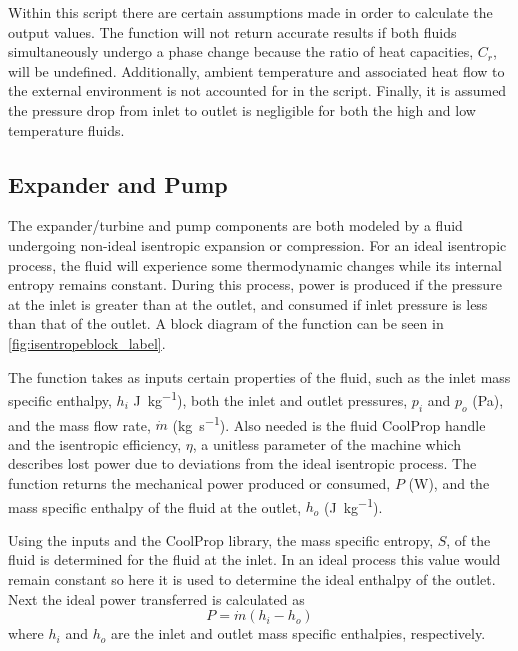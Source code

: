 Within this script there are certain assumptions made in order to calculate the output values. The function will not return accurate results if both fluids simultaneously undergo a phase change because the ratio of heat capacities, $C_r$, will be undefined. Additionally, ambient temperature and associated heat flow to the external environment is not accounted for in the script. Finally, it is assumed the pressure drop from inlet to outlet is negligible for both the high and low temperature fluids. 


\subsection{Expander and Pump}
\label{sec:isentrope}
The expander/turbine and pump components are both modeled by a fluid undergoing non-ideal isentropic expansion or compression. For an ideal isentropic process, the fluid will experience some thermodynamic changes while its internal entropy remains constant. During this process, power is produced if the pressure at the inlet is greater than at the outlet, and consumed if inlet pressure is less than that of the outlet. A block diagram of the function can be seen in \autoref{fig:isentropeblock_label}.


The function takes as inputs certain properties of the fluid, such as the inlet mass specific enthalpy, $h_i$ \si{\joule\per\kilogram}), both the inlet and outlet pressures, $p_i$ and $p_o$ (\si{\pascal}), and the mass flow rate, $\dot{m}$ (\si{\kilogram\per\second}). Also needed is the fluid CoolProp handle and the isentropic efficiency, $\eta$, a unitless parameter of the machine which describes lost power due to deviations from the ideal isentropic process. The function returns the mechanical power produced or consumed, $P$ (\si{\watt}), and the mass specific enthalpy of the fluid at the outlet, $h_o$ (\si{\joule\per\kilogram}).

Using the inputs and the CoolProp library, the mass specific entropy, $S$, of the fluid is determined for the fluid at the inlet. In an ideal process this value would remain constant so here it is used to determine the ideal enthalpy of the outlet. Next the ideal power transferred is calculated as 
\begin{equation}
\label{eq:power_enthalpy}
P = \dot{m} \left(h_i - h_o\right)
\end{equation}
where $h_i$ and $h_o$ are the inlet and outlet mass specific enthalpies, respectively.


